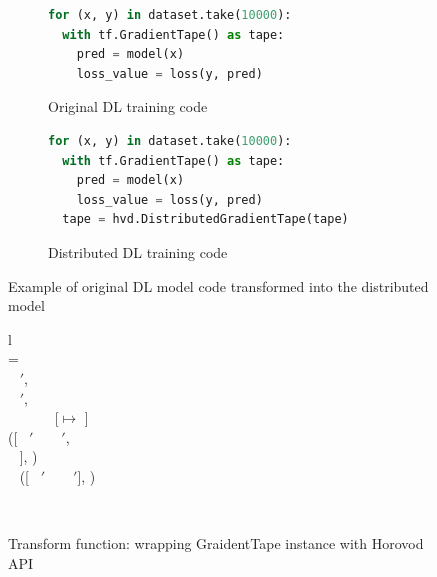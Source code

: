\begin{figure}[ht!]
  \centering
  \begin{subfigure}[t]{0.48\textwidth}
    \begin{lstlisting}[language=Python]
for (x, y) in dataset.take(10000):
  with tf.GradientTape() as tape:
    pred = model(x)
    loss_value = loss(y, pred)\end{lstlisting} 
    \caption{Original DL training code}
  \end{subfigure}
  \hspace{5mm}
  \begin{subfigure}[t]{0.48\textwidth}
    \begin{lstlisting}[language=Python]
for (x, y) in dataset.take(10000):
  with tf.GradientTape() as tape:
    pred = model(x)
    loss_value = loss(y, pred) 
  tape = hvd.DistributedGradientTape(tape)\end{lstlisting}
    \caption{Distributed DL training code}
  \end{subfigure}
  \caption{Example of original DL model code transformed into the distributed model}
  \label{fig:trans:ex03}
\end{figure}

\begin{figure}[ht!]
  \centering
  \begin{tabular}{l}
  \\
  \tstmt{\kwith ~ \mul{\nwithitem} ~ \kcolon ~ \mul{\nstmt}}{\smodenv} = \\
  \inden \ktlet ~ \mul{\nwithitem}$'$,  \kteq ~ \twwithitem{\mul{\nwithitem}}{\smodenv} \ktin \\
  \inden \ktlet ~ \mul{\nstmt}$'$,  \kteq ~  \ktin \\
  \inden \ktif ~  \envsub ~ \smodenv ~ \kteq ~ [\gtape $\mapsto$ \nid] ~ \ktthen\\
  \inden\inden ([\kwith ~ \mul{\nwithitem}$'$ ~ \kcolon ~ \mul{\nstmt}$'$, \\
  \inden\inden \nid ~ ], )\\
  \inden \ktelse ~ ([\kwith ~ \mul{\nwithitem}$'$ ~ \kcolon ~ \mul{\nstmt}$'$], )
\end{tabular}\\\vpar
  \caption{Transform function: wrapping GraidentTape instance with Horovod API}
  \label{fig:trans:fn03}
\end{figure}

